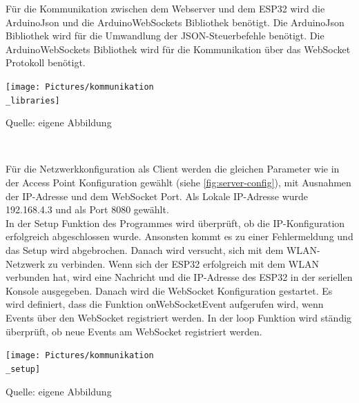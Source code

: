 \documentclass[ngerman,12pt,a4paper]{article}
\begin{document}
	Für die Kommunikation zwischen dem Webserver und dem ESP32 wird die ArduinoJson und die ArduinoWebSockets Bibliothek benötigt. Die ArduinoJson Bibliothek wird für die Umwandlung der JSON-Steuerbefehle benötigt. Die ArduinoWebSockets Bibliothek wird für die Kommunikation über das WebSocket Protokoll benötigt. \\
	\begin{center}
		\begin{minipage}[t]{0.45\textwidth}
			\texttt{[image: Pictures/kommunikation\\\_libraries]}
			\label{fig:kommunikation_libraries}
			\vspace{-10pt}
			\begin{center}
				\par\small Quelle: eigene Abbildung 
			\end{center}
		\end{minipage} \\[0.75cm]
	\end{center}
	Für die Netzwerkkonfiguration als Client werden die gleichen Parameter wie in der Access Point Konfiguration gewählt (siehe \ref{fig:server-config}), mit Ausnahmen der IP-Adresse und dem WebSocket Port. Als Lokale IP-Adresse wurde 192.168.4.3 und als Port 8080 gewählt.\\[1cm]
	In der Setup Funktion des Programmes wird überprüft, ob die IP-Konfiguration erfolgreich abgeschlossen wurde. Ansonsten kommt es zu einer Fehlermeldung und das Setup wird abgebrochen. Danach wird versucht, sich mit dem WLAN-Netzwerk zu verbinden. Wenn sich der ESP32 erfolgreich mit dem WLAN verbunden hat, wird eine Nachricht und die IP-Adresse des ESP32 in der seriellen Konsole ausgegeben. Danach wird die WebSocket Konfiguration gestartet. Es wird definiert, dass die Funktion onWebSocketEvent aufgerufen wird, wenn Events über den WebSocket registriert werden. In der loop Funktion wird ständig überprüft, ob neue Events am WebSocket registriert werden.
	\begin{center}
		\begin{minipage}[t]{0.55\textwidth}
			\texttt{[image: Pictures/kommunikation\\\_setup]}
			\label{fig:kommunikation_setup}
			\vspace{-10pt}
			\begin{center}
				\par\small Quelle: eigene Abbildung 
			\end{center}
		\end{minipage} \\[0.75cm]
	\end{center}	
	
\end{document}
